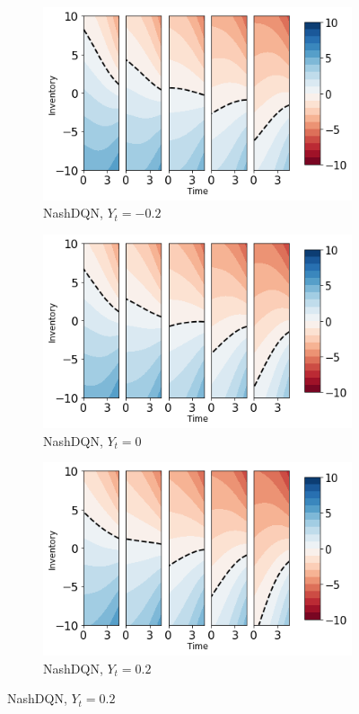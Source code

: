 \documentclass[onefignum,onetabnum]{siamonline171218}
\begin{document}
\begin{figure}[t!]
\centering
\begin{subfigure}{.32\textwidth}
  \centering
  \includegraphics[width=1\linewidth]{Figures/Nash_hm_-0.2.jpg}
  \caption{NashDQN, $Y_{t}=-0.2$}
\end{subfigure}%
\begin{subfigure}{.32\textwidth}
  \centering
  \includegraphics[width=1\linewidth]{Figures/Nash_hm_0.jpg}
  \caption{NashDQN, $Y_{t}=0$}
\end{subfigure}
\begin{subfigure}{.32\textwidth}
  \centering
  \includegraphics[width=1\linewidth]{Figures/Nash_hm_0.2.jpg}
  \caption{NashDQN, $Y_{t}=0.2$}
\end{subfigure}


\end{figure}
\end{document}
